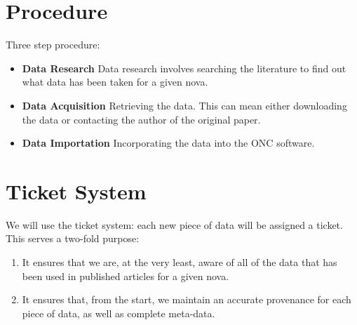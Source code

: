 \documentclass{article}
\begin{document}
%


\section{Procedure}
Three step procedure:
\begin{itemize}
\item \textbf{Data Research} Data research involves searching the literature to find out what data has been taken for a given nova.
\item \textbf{Data Acquisition} Retrieving the data. This can mean either downloading the data or contacting the author of the original paper.
\item \textbf{Data Importation} Incorporating the data into the ONC software.
\end{itemize}


\section{Ticket System}
We will use the ticket system: each new piece of data will be assigned a ticket. This serves a two-fold purpose: 
\begin{enumerate}
\item  It ensures that we are, at the very least, aware of all of the data that has been used in published articles for a given nova.
\item It ensures that, from the start, we maintain an accurate provenance for each piece of data, as well as complete meta-data.
\end{enumerate}
\end{document}
